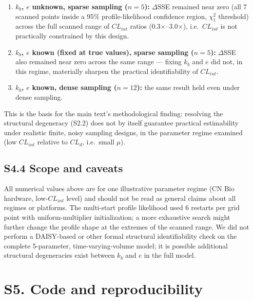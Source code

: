\documentclass[11pt]{article}
\begin{document}
\begin{enumerate}
\item \textbf{$k_b$, $e$ unknown, sparse sampling ($n=5$):} $\Delta$SSE remained near zero (all 7 scanned points inside a 95\% profile-likelihood confidence region, $\chi^2_1$ threshold) across the full scanned range of $CL_{int}$ ratios (0.3$\times$--3.0$\times$), i.e.\ $CL_{int}$ is not practically constrained by this design.
\item \textbf{$k_b$, $e$ known (fixed at true values), sparse sampling ($n=5$):} $\Delta$SSE also remained near zero across the same range --- fixing $k_b$ and $e$ did not, in this regime, materially sharpen the practical identifiability of $CL_{int}$.
\item \textbf{$k_b$, $e$ known, dense sampling ($n=12$):} the same result held even under dense sampling.
\end{enumerate}

This is the basis for the main text's methodological finding: resolving the structural degeneracy (S2.2) does not by itself guarantee practical estimability under realistic finite, noisy sampling designs, in the parameter regime examined (low $CL_{int}$ relative to $CL_d$, i.e.\ small $\mu$).

\subsection*{S4.4 Scope and caveats}

All numerical values above are for one illustrative parameter regime (CN Bio hardware, low-$CL_{int}$ level) and should not be read as general claims about all regimes or platforms. The multi-start profile likelihood used 6 restarts per grid point with uniform-multiplier initialization; a more exhaustive search might further change the profile shape at the extremes of the scanned range. We did not perform a DAISY-based or other formal structural identifiability check on the complete 5-parameter, time-varying-volume model; it is possible additional structural degeneracies exist between $k_b$ and $e$ in the full model.

\section*{S5. Code and reproducibility}
\end{document}
